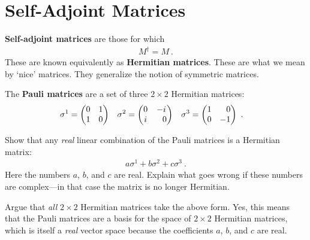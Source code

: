 \section{Self-Adjoint Matrices}

\textbf{Self-adjoint matrices} are those for which
\begin{align}
M^\dag = M \ .     
\label{eq:self:adjoint}
\end{align}
These are known equivalently as \textbf{Hermitian matrices}.
These are what we mean by `nice' matrices. They generalize the notion of symmetric matrices. 
\begin{example}
The \textbf{Pauli matrices} are a set of three $2\times 2$ Hermitian matrices:
\begin{align}
    \sigma^1
    &=
    \begin{pmatrix}
        0 & 1 \\
        1 & 0
    \end{pmatrix}
    &
    \sigma^2
    &=
    \begin{pmatrix}
        0 & -i \\
        i & \pp 0
    \end{pmatrix}
    &
    \sigma^3
    &=
    \begin{pmatrix}
        1 & \pp 0 \\
        0 & -1
    \end{pmatrix} \ .
\end{align}
\end{example}
\begin{exercise}
Show that any \emph{real} linear combination of the Pauli matrices is a Hermitian matrix:
\begin{align}
    a \sigma^1 + b \sigma^2 + c\sigma^3 \ .
\end{align}
Here the numbers $a$, $b$, and $c$ are real. Explain what goes wrong if these numbers are complex---in that case the matrix is no longer Hermitian.

Argue that \emph{all} $2\times 2$ Hermitian matrices take the above form. Yes, this means that the Pauli matrices are a basis for the space of $2\times 2$ Hermitian matrices, which is itself a \emph{real} vector space because the coefficients $a$, $b$, and $c$ are real.
\end{exercise}


